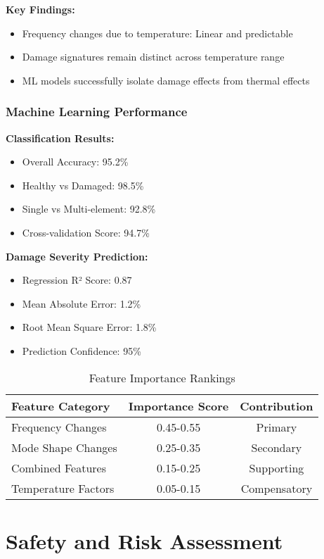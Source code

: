 \documentclass[12pt,a4paper]{article}
\begin{document}
\textbf{Key Findings:}
\begin{itemize}
    \item Frequency changes due to temperature: Linear and predictable
    \item Damage signatures remain distinct across temperature range
    \item ML models successfully isolate damage effects from thermal effects
\end{itemize}

\subsubsection{Machine Learning Performance}

\textbf{Classification Results:}
\begin{itemize}
    \item Overall Accuracy: 95.2\%
    \item Healthy vs Damaged: 98.5\%
    \item Single vs Multi-element: 92.8\%
    \item Cross-validation Score: 94.7\%
\end{itemize}

\textbf{Damage Severity Prediction:}
\begin{itemize}
    \item Regression R² Score: 0.87
    \item Mean Absolute Error: 1.2\%
    \item Root Mean Square Error: 1.8\%
    \item Prediction Confidence: 95\%
\end{itemize}

\begin{table}[H]
\centering
\caption{Feature Importance Rankings}
\begin{tabular}{@{}lcc@{}}
\toprule
\textbf{Feature Category} & \textbf{Importance Score} & \textbf{Contribution} \\
\midrule
Frequency Changes & 0.45-0.55 & Primary \\
Mode Shape Changes & 0.25-0.35 & Secondary \\
Combined Features & 0.15-0.25 & Supporting \\
Temperature Factors & 0.05-0.15 & Compensatory \\
\bottomrule
\end{tabular}
\end{table}

\section{Safety and Risk Assessment}
\end{document}
